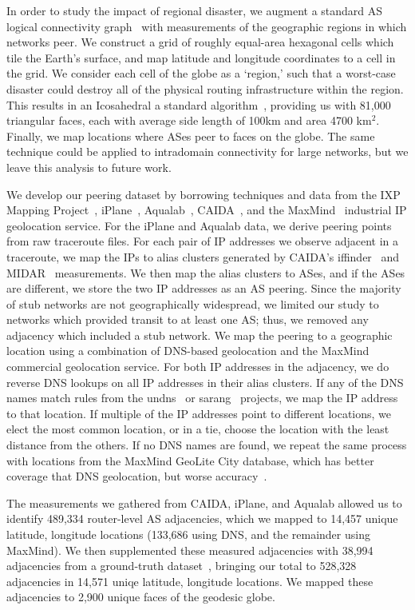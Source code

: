 
In order to study the impact of regional disaster, we augment a standard AS
logical connectivity graph~\cite{caida-asgraph} with measurements of the
geographic regions in which networks peer.  We construct a grid of roughly
equal-area hexagonal cells which tile the Earth's surface, and map latitude and
longitude coordinates to a cell in the grid.  We consider each cell of the globe
as a `region,' such that a worst-case disaster could destroy all of the physical
routing infrastructure within the region.  This results in an Icosahedral  
a standard algorithm~\cite{geodesic}, providing us with 81,000 triangular
faces, each with average side length of 100km and area 4700 km$^2$.  Finally,
we map locations where ASes peer to faces on the globe.  The same technique
could be applied to intradomain connectivity for large networks, but we leave
this analysis to future work.    

We develop our peering dataset by borrowing techniques and data from the IXP
Mapping Project~\cite{ixps-mapped}, iPlane~\cite{iplane},
Aqualab~\cite{sidewalk}, CAIDA~\cite{caidadata}, and the MaxMind~\cite{maxmind}
industrial IP geolocation service.  For the iPlane and Aqualab data, we derive
peering points from raw traceroute files.  For each pair of IP addresses we
observe adjacent in a traceroute, we map the IPs to alias clusters generated by
CAIDA's iffinder~\cite{iffinder} and MIDAR~\cite{iffinder, midar} measurements.
We then map the alias clusters to ASes, and if the ASes are different, we store
the two IP addresses as an AS peering.  Since the majority of stub networks are
not geographically widespread, we limited our study to networks which provided
transit to at least one AS; thus, we removed any adjacency which included a
stub network.  We map the peering to a geographic location using a combination
of DNS-based geolocation and the MaxMind commercial geolocation service.  For
both IP addresses in the adjacency, we do reverse DNS lookups on all IP
addresses in their alias clusters.  If any of the DNS names match rules from
the undns~\cite{undns} or sarang~\cite{sarang} projects, we map the IP address
to that location.  If multiple of the IP addresses point to different
locations, we elect the most common location, or in a tie, choose the location
with the least distance from the others.  If no DNS names are found, we repeat
the same process with locations from the MaxMind GeoLite City database, which
has better coverage that DNS geolocation, but worse
accuracy~\cite{uhlig_ccr_paper}. 

The measurements we gathered from CAIDA, iPlane, and Aqualab allowed us to
identify 489,334 router-level AS adjacencies, which we mapped to 14,457 unique
latitude, longitude locations (133,686 using DNS, and the remainder using
MaxMind).  We then supplemented these measured adjacencies with 38,994
adjacencies from a ground-truth dataset~\cite{ixps-mapped}, bringing our total
to 528,328 adjacencies in 14,571 uniqe latitude, longitude locations.  We
mapped these adjacencies to 2,900 unique faces of the geodesic globe.   

